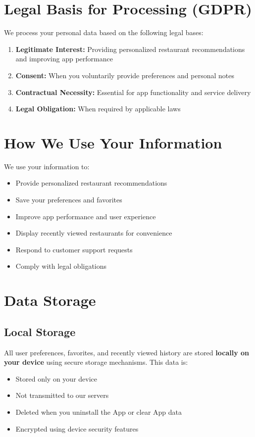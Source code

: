 \documentclass[11pt,letterpaper]{article}
\begin{document}
\section{Legal Basis for Processing (GDPR)}

We process your personal data based on the following legal bases:

\begin{enumerate}
    \item \textbf{Legitimate Interest:} Providing personalized restaurant recommendations and improving app performance
    \item \textbf{Consent:} When you voluntarily provide preferences and personal notes
    \item \textbf{Contractual Necessity:} Essential for app functionality and service delivery
    \item \textbf{Legal Obligation:} When required by applicable laws
\end{enumerate}

\section{How We Use Your Information}

We use your information to:
\begin{itemize}
    \item Provide personalized restaurant recommendations
    \item Save your preferences and favorites
    \item Improve app performance and user experience
    \item Display recently viewed restaurants for convenience
    \item Respond to customer support requests
    \item Comply with legal obligations
\end{itemize}

\section{Data Storage}

\subsection{Local Storage}
All user preferences, favorites, and recently viewed history are stored \textbf{locally on your device} using secure storage mechanisms. This data is:
\begin{itemize}
    \item Stored only on your device
    \item Not transmitted to our servers
    \item Deleted when you uninstall the App or clear App data
    \item Encrypted using device security features
\end{itemize}
\end{document}
